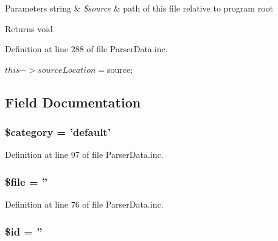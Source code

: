 \begin{DoxyParams}[1]{\-Parameters}
string & {\em \$source} & path of this file relative to program root\\
\hline
\end{DoxyParams}
\begin{DoxyReturn}{\-Returns}
void 
\end{DoxyReturn}


\-Definition at line 288 of file \-Parser\-Data.\-inc.


\begin{DoxyCode}
    {
        $this->sourceLocation = $source;
    }
\end{DoxyCode}


\subsection{\-Field \-Documentation}
\hypertarget{classparser_page_a18b2a8d133fa7733bf34abcc6ca2ef5b}{
\subsubsection[{\$category}]{\setlength{\rightskip}{0pt plus 5cm}\$category = 'default'}}\label{classparser_page_a18b2a8d133fa7733bf34abcc6ca2ef5b}


\-Definition at line 97 of file \-Parser\-Data.\-inc.

\hypertarget{classparser_page_aa1bfbd27060176201b271918dff57e8f}{
\subsubsection[{\$file}]{\setlength{\rightskip}{0pt plus 5cm}\$file = ''}}\label{classparser_page_aa1bfbd27060176201b271918dff57e8f}


\-Definition at line 76 of file \-Parser\-Data.\-inc.

\hypertarget{classparser_page_ae97941710d863131c700f069b109991e}{
\subsubsection[{\$id}]{\setlength{\rightskip}{0pt plus 5cm}\$id = ''}}\label{classparser_page_ae97941710d863131c700f069b109991e}


